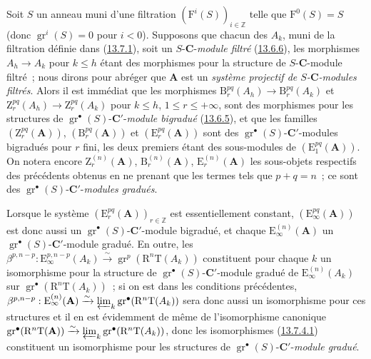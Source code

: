 \begin{env}[13.7.6]
\label{0.13.7.6-fr}
Soit $S$ un anneau muni d'une filtration
$(\mathrm F^i(S))_{i\in\mathbb Z}$ telle que $\mathrm F^0(S)=S$ (donc
$\operatorname{gr}^i(S)=0$ pour $i<0$). Supposons que chacun des $A_k$,
muni de la filtration définie dans
(\hyperref[0.13.7.1-fr]{13.7.1}), soit un $S$-$\boldsymbol{C}$-\emph{module filtré}
(\hyperref[0.13.6.6-fr]{13.6.6}), les morphismes $A_h\to A_k$ pour
$k\leq h$ étant des morphismes pour la structure de $S$-$\boldsymbol{C}$-module
filtré~; nous dirons pour abréger que $\mathbf A$ est un \emph{système
projectif de $S$-$\boldsymbol{C}$-modules filtrés}. Alors il est immédiat que les
morphismes $\mathrm B_r^{pq}(A_h)\to\mathrm B_r^{pq}(A_k)$ et
$\mathrm Z_r^{pq}(A_h)\to\mathrm Z_r^{pq}(A_k)$ pour $k\leq h$,
$1\leq r\leq+\infty$, sont des morphismes pour les structures de
$\operatorname{gr}^\bullet(S)$-$\boldsymbol{C}'$-\emph{module bigradué}
(\hyperref[0.13.6.5-fr]{13.6.5}), et que les familles
$(\mathrm Z_r^{pq}(\mathbf A))$, $(\mathrm B_r^{pq}(\mathbf A))$ et
$(\mathrm E_r^{pq}(\mathbf A))$ sont des
$\operatorname{gr}^\bullet(S)$-$\boldsymbol{C}'$-modules bigradués pour $r$ fini,
les deux premiers étant des sous-modules de
$(\mathrm E_1^{pq}(\mathbf A))$. On notera encore
$\mathrm Z_r^{(n)}(\mathbf A)$, $\mathrm B_r^{(n)}(\mathbf A)$,
$\mathrm E_r^{(n)}(\mathbf A)$ les sous-objets respectifs des précédents
obtenus en ne prenant que les termes tels que $p+q=n$~; ce sont des
$\operatorname{gr}^\bullet(S)$-$\boldsymbol{C}'$-\emph{modules gradués}.

Lorsque le système $(\mathrm E_r^{pq}(\mathbf A))_{r\in\mathbb Z}$ est
essentiellement constant, $(\mathrm E_\infty^{pq}(\mathbf A))$ est donc
aussi un $\operatorname{gr}^\bullet(S)$-$\boldsymbol{C}'$-module bigradué, et chaque
$\mathrm E_\infty^{(n)}(\mathbf A)$ un
$\operatorname{gr}^\bullet(S)$-$\boldsymbol{C}'$-module gradué. En outre, les
$\beta^{p,n-p}:\mathrm E_\infty^{p,n-p}(A_k)\xrightarrow{\sim}
\operatorname{gr}^p(\mathrm R^n\mathrm T(A_k))$ constituent pour chaque
$k$ un isomorphisme pour la structure de
$\operatorname{gr}^\bullet(S)$-$\boldsymbol{C}'$-module gradué de
$\mathrm E_\infty^{(n)}(A_k)$ sur
$\operatorname{gr}^\bullet(\mathrm R^n\mathrm T(A_k))$~; si on est dans
les conditions précédentes,
$\beta^{p,n-p}:\mathrm E_\infty^{(n)}(\mathbf A)\xrightarrow{\sim}
\varprojlim_k\operatorname{gr}^\bullet(\mathrm R^n\mathrm T(A_k))$
sera donc aussi un isomorphisme pour ces structures et il en est
évidemment de même de l'isomorphisme canonique
$\operatorname{gr}^\bullet(\mathrm R^n\mathrm T(\mathbf A))
\xrightarrow{\sim}
\varprojlim_k\operatorname{gr}^\bullet(\mathrm R^n\mathrm T(A_k))$,
donc les isomorphismes
(\hyperref[0.13.7.4.1-fr]{13.7.4.1}) constituent un isomorphisme pour les
structures de $\operatorname{gr}^\bullet(S)$-$\boldsymbol{C}'$-\emph{module gradué}.
\end{env}

